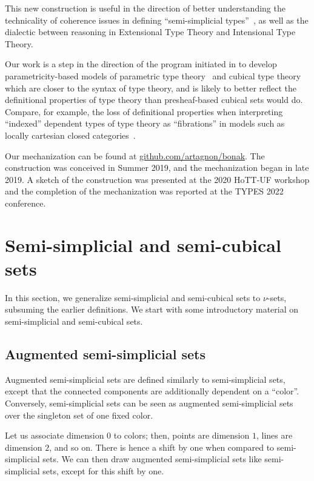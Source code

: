 \documentclass{msc}
\begin{document}
This new construction is useful in the direction of better understanding the technicality of coherence issues in defining ``semi-simplicial types''~\citep{part15,shulman14,altenkirch16,kraus17}, as well as the dialectic between reasoning in Extensional Type Theory and Intensional Type Theory.

Our work is a step in the direction of the program initiated in \cite{altenkirch15} to develop parametricity-based models of parametric type theory~\citep{bernardy15,nuyts17,cavallo19} and cubical type theory~\citep{bezem13,cohen16,angiuli21} which are closer to the syntax of type theory, and is likely to better reflect the definitional properties of type theory than presheaf-based cubical sets would do. Compare, for example, the loss of definitional properties when interpreting ``indexed'' dependent types of type theory as ``fibrations'' in models such as locally cartesian closed categories~\citep{curien14}.

Our mechanization can be found at \href{https://github.com/artagnon/bonak}{github.com/artagnon/bonak}. The construction was conceived in Summer 2019, and the mechanization began in late 2019. A sketch of the construction was presented at the 2020 HoTT-UF workshop and the completion of the mechanization was reported at the TYPES 2022 conference.

\section{Semi-simplicial and semi-cubical sets\label{sec:nu}}
In this section, we generalize semi-simplicial and semi-cubical sets to $\nu$-sets, subsuming the earlier definitions. We start with some introductory material on semi-simplicial and semi-cubical sets.

\subsection*{Augmented semi-simplicial sets}
Augmented semi-simplicial sets are defined similarly to semi-simplicial sets, except that the connected components are additionally dependent on a ``color''. Conversely, semi-simplicial sets can be seen as augmented semi-simplicial sets over the singleton set of one fixed color.

Let us associate dimension $0$ to colors; then, points are dimension $1$, lines are dimension $2$, and so on. There is hence a shift by one when compared to semi-simplicial sets. We can then draw augmented semi-simplicial sets like semi-simplicial sets, except for this shift by one.
\end{document}

